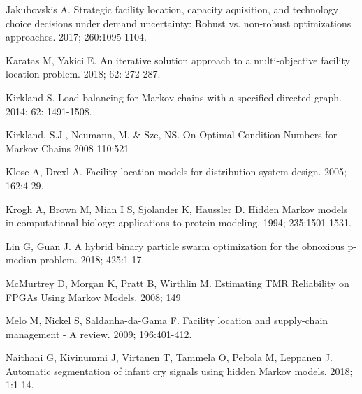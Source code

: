 \documentclass[twoside,twocolumn]{article}
\begin{document}
\begin{thebibliography}{99}
Jakubovskis A.
\newblock Strategic facility location, capacity aquisition, and technology choice decisions under demand uncertainty: Robust vs. non-robust optimizations approaches.
 2017; 260:1095-1104.

Karatas M, Yakici E.
\newblock An iterative solution approach to a multi-objective facility location problem.
 2018; 62: 272-287.

Kirkland S.
\newblock Load balancing for Markov chains with a specified directed graph.
 2014; 62: 1491-1508.

Kirkland, S.J., Neumann, M. \& Sze, NS.
\newblock On Optimal Condition Numbers for Markov Chains
 2008 110:521

Klose A, Drexl A.
\newblock Facility location models for distribution system design.
 2005; 162:4-29.

Krogh A, Brown M, Mian I S, Sjolander K, Haussler D.
\newblock Hidden Markov models in computational biology: applications to protein modeling.
 1994; 235:1501-1531.

Lin G, Guan J.
\newblock A hybrid binary particle swarm optimization for the obnoxious p-median problem.
 2018; 425:1-17.

McMurtrey D, Morgan K, Pratt B, Wirthlin M.
\newblock Estimating TMR Reliability on FPGAs Using Markov Models.
 2008; 149

Melo M, Nickel S, Saldanha-da-Gama F.
\newblock Facility location and supply-chain management - A review.
  2009; 196:401-412.

Naithani G, Kivinummi J, Virtanen T, Tammela O, Peltola M, Leppanen J.
\newblock Automatic segmentation of infant cry signals using hidden Markov models.
 2018; 1:1-14.


\end{thebibliography}
\end{document}
